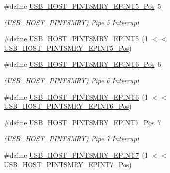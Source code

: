 \begin{DoxyCompactItemize}
\item 
\#define \mbox{\hyperlink{group___s_a_m_d21___u_s_b_ga0107fb520599781e8f7ffcc5f0a09fad}{U\+S\+B\+\_\+\+H\+O\+S\+T\+\_\+\+P\+I\+N\+T\+S\+M\+R\+Y\+\_\+\+E\+P\+I\+N\+T5\+\_\+\+Pos}}~5
\begin{DoxyCompactList}\small\item\em (U\+S\+B\+\_\+\+H\+O\+S\+T\+\_\+\+P\+I\+N\+T\+S\+M\+RY) Pipe 5 Interrupt \end{DoxyCompactList}\item 
\#define \mbox{\hyperlink{group___s_a_m_d21___u_s_b_ga68585c86a0e241af17ba7cdf87306cb9}{U\+S\+B\+\_\+\+H\+O\+S\+T\+\_\+\+P\+I\+N\+T\+S\+M\+R\+Y\+\_\+\+E\+P\+I\+N\+T5}}~(1 $<$$<$ \mbox{\hyperlink{group___s_a_m_d21___u_s_b_ga0107fb520599781e8f7ffcc5f0a09fad}{U\+S\+B\+\_\+\+H\+O\+S\+T\+\_\+\+P\+I\+N\+T\+S\+M\+R\+Y\+\_\+\+E\+P\+I\+N\+T5\+\_\+\+Pos}})
\item 
\#define \mbox{\hyperlink{group___s_a_m_d21___u_s_b_ga599d4683711515396759139cde13c6e5}{U\+S\+B\+\_\+\+H\+O\+S\+T\+\_\+\+P\+I\+N\+T\+S\+M\+R\+Y\+\_\+\+E\+P\+I\+N\+T6\+\_\+\+Pos}}~6
\begin{DoxyCompactList}\small\item\em (U\+S\+B\+\_\+\+H\+O\+S\+T\+\_\+\+P\+I\+N\+T\+S\+M\+RY) Pipe 6 Interrupt \end{DoxyCompactList}\item 
\#define \mbox{\hyperlink{group___s_a_m_d21___u_s_b_ga898009c02eaf014ea4405450e61a1701}{U\+S\+B\+\_\+\+H\+O\+S\+T\+\_\+\+P\+I\+N\+T\+S\+M\+R\+Y\+\_\+\+E\+P\+I\+N\+T6}}~(1 $<$$<$ \mbox{\hyperlink{group___s_a_m_d21___u_s_b_ga599d4683711515396759139cde13c6e5}{U\+S\+B\+\_\+\+H\+O\+S\+T\+\_\+\+P\+I\+N\+T\+S\+M\+R\+Y\+\_\+\+E\+P\+I\+N\+T6\+\_\+\+Pos}})
\item 
\#define \mbox{\hyperlink{group___s_a_m_d21___u_s_b_ga8f5e1ba40fbc980904639a70389932b0}{U\+S\+B\+\_\+\+H\+O\+S\+T\+\_\+\+P\+I\+N\+T\+S\+M\+R\+Y\+\_\+\+E\+P\+I\+N\+T7\+\_\+\+Pos}}~7
\begin{DoxyCompactList}\small\item\em (U\+S\+B\+\_\+\+H\+O\+S\+T\+\_\+\+P\+I\+N\+T\+S\+M\+RY) Pipe 7 Interrupt \end{DoxyCompactList}\item 
\#define \mbox{\hyperlink{group___s_a_m_d21___u_s_b_gaedcd446eab4502b8f701aa8288c7bac7}{U\+S\+B\+\_\+\+H\+O\+S\+T\+\_\+\+P\+I\+N\+T\+S\+M\+R\+Y\+\_\+\+E\+P\+I\+N\+T7}}~(1 $<$$<$ \mbox{\hyperlink{group___s_a_m_d21___u_s_b_ga8f5e1ba40fbc980904639a70389932b0}{U\+S\+B\+\_\+\+H\+O\+S\+T\+\_\+\+P\+I\+N\+T\+S\+M\+R\+Y\+\_\+\+E\+P\+I\+N\+T7\+\_\+\+Pos}})
$$
\end{DoxyCompactItemize}
